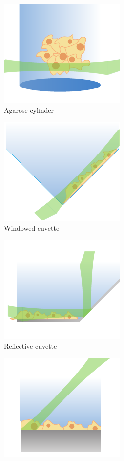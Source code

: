 \begin{figure}
    \centering
    \begin{subfigure}[b]{0.4\linewidth}
         \centering
        \includegraphics{mounting_strategies_cells/fep}
         \caption{Agarose cylinder}
    \end{subfigure}
    \begin{subfigure}[b]{0.4\linewidth}
             \centering
        \includegraphics{mounting_strategies_cells/cuvette}
         \caption{Windowed cuvette}
    \end{subfigure}
    \begin{subfigure}[b]{0.4\linewidth}
             \centering
        \includegraphics{mounting_strategies_cells/mirrored}
         \caption{Reflective cuvette}
    \end{subfigure}
    \begin{subfigure}[b]{0.4\linewidth}
             \centering
        \includegraphics{mounting_strategies_cells/pedestal}

\end{subfigure}
\end{figure}
